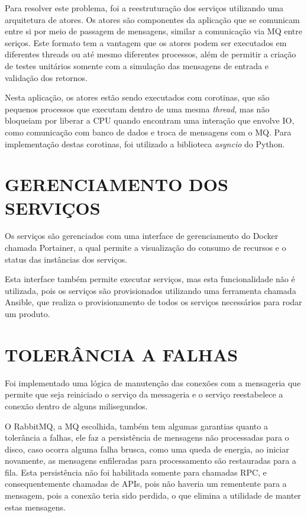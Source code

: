 Para resolver este problema, foi a reestruturação dos serviços utilizando
uma arquitetura de atores. Os atores são componentes da aplicação que se
comunicam entre si por meio de passagem de mensagens, similar a comunicação
via \ac{MQ} entre seriços. Este formato tem a vantagem que os atores podem
ser executados em diferentes threads ou até mesmo diferentes processos,
além de permitir a criação de testes unitários somente com a simulação das
mensagens de entrada e validação dos retornos.

Nesta aplicação, os atores estão sendo executados com corotinas, que são
pequenos processos que executam dentro de uma mesma \emph{thread}, mas não
bloqueiam por liberar a \ac{CPU} quando encontram uma interação que envolve
\ac{IO}, como comunicação com banco de dados e troca de mensagens com o
\ac{MQ}. Para implementação destas corotinas, foi utilizado a biblioteca
\emph{asyncio} do Python.

\section{GERENCIAMENTO DOS SERVIÇOS}

Os serviços são gerenciados com uma interface de gerenciamento do Docker chamada
Portainer, a qual permite a visualização do consumo de recursos e o status das
instâncias dos serviços.

Esta interface também permite executar serviços, mas esta funcionalidade não é
utilizada, pois os serviços são provisionados utilizando uma ferramenta chamada
Ansible, que realiza o provisionamento de todos os serviços necessários para
rodar um produto.

\section{TOLERÂNCIA A FALHAS}

Foi implementado uma lógica de manutenção das conexões com a mensageria que permite
que seja reiniciado o serviço da messageria e o serviço reestabelece a conexão dentro
de alguns milisegundos.

O RabbitMQ, a \ac{MQ} escolhida, também tem algumas garantias quanto a tolerância a
falhas, ele faz a persistência de mensagens não processadas para o disco, caso ocorra
alguma falha brusca, como uma queda de energia, ao iniciar novamente, as mensagens
enfileradas para processamento são restauradas para a fila. Esta persistência não foi
habilitada somente para chamadas \ac{RPC}, e consequentemente chamadas de \acp{API},
pois não haveria um rementente para a mensagem, pois a conexão teria sido perdida,
o que elimina a utilidade de manter estas mensagens.

